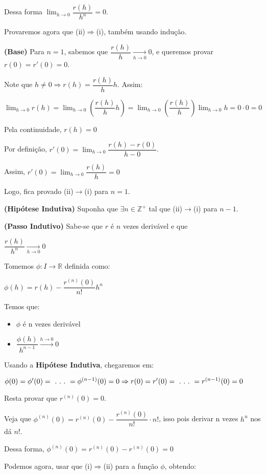\documentclass[12pt]{article}
\begin{document}
Dessa forma $\displaystyle\lim_{h\to0}\dfrac{r(h)}{h^n}=0$.

Provaremos agora que (ii)$\Rightarrow$(i), também usando indução.

\textbf{(Base)} Para $n=1$, sabemos que $\dfrac{r(h)}{h}\underset{h\to0}{\longrightarrow}0$, e queremos provar $r(0)=r'(0)=0$.

Note que $h\neq0\Rightarrow r(h)=\dfrac{r(h)}{h}h$. Assim:

$\displaystyle\lim_{h\to0} r(h) = \lim_{h\to0} \left(\dfrac{r(h)}{h}h\right)=\lim_{h\to0}\left(\dfrac{r(h)}{h}\right)\lim_{h\to0} h = 0\cdot 0 =0$

Pela continuidade, $r(h)=0$

Por definição, $r'(0)=\displaystyle\lim_{h\to0}\dfrac{r(h)-r(0)}{h-0}$.

Assim, $r'(0)=\displaystyle\lim_{h\to0}\dfrac{r(h)}{h}=0$

Logo, fica provado (ii)$\rightarrow$(i) para $n=1$.

\textbf{(Hipótese Indutiva)} Suponha que $\exists n\in\mathbb{Z}^+$ tal que (ii)$\rightarrow$(i) para $n-1$.

\textbf{(Passo Indutivo)} Sabe-se que $r$ é $n$ vezes derivável e que

$\dfrac{r(h)}{h^n}\underset{h\to0}{\longrightarrow}0$

Tomemos $\phi:I\longrightarrow\mathbb{R}$ definida como:

$\phi(h)=r(h)-\dfrac{r^{(n)}(0)}{n!}h^n$

Temos que:

\begin{itemize}
    \item $\phi$ é n vezes derivável
    \item $\dfrac{\phi(h)}{h^{n-1}}\overset{h\to0}{\longrightarrow}0$
\end{itemize}
    
Usando a \textbf{Hipótese Indutiva}, chegaremos em:

$\phi(0)=\phi'(0)=~.~.~.~=\phi^{(n-1)}(0)=0\Rightarrow\\
r(0)=r'(0)=~.~.~.~=r^{(n-1)}(0)=0$

Resta provar que $r^{(n)}(0)=0$.

Veja que $\phi^{(n)}(0)=r^{(n)}(0)-\dfrac{r^{(n)}(0)}{n!}\cdot n!$, isso pois derivar n vezes $h^n$ nos dá $n!$.

Dessa forma, $\phi^{(n)}(0)=r^{(n)}(0)-r^{(n)}(0)=0$

Podemos agora, usar que (i)$\Rightarrow$(ii) para a função $\phi$, obtendo:
\end{document}
